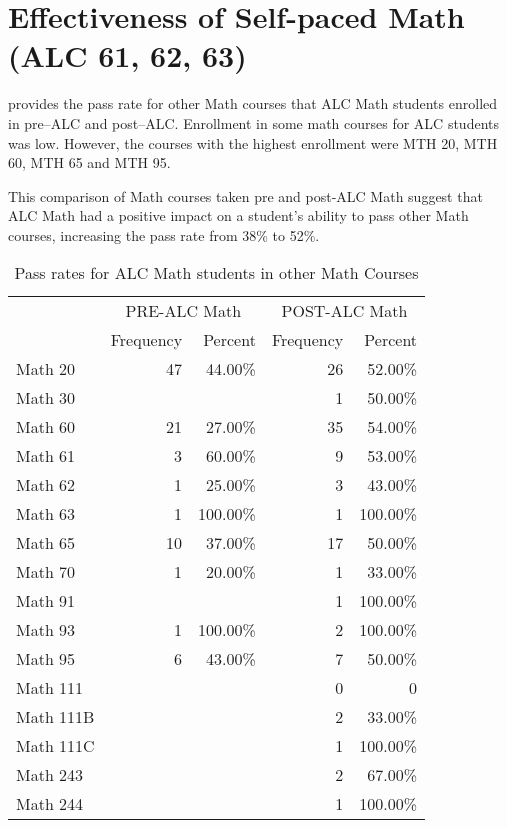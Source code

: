 \chapter{Effectiveness of Self-paced Math (ALC 61, 62, 63)}
\label{app:sec:effectivenessALC}

 provides the pass rate for other Math courses that ALC Math students 
enrolled in pre--ALC and post--ALC.  Enrollment in some math courses for 
ALC students was low.  However, the courses with the highest enrollment 
were MTH 20, MTH 60, MTH 65 and MTH 95.

This comparison of Math courses taken pre and post-ALC Math suggest 
that ALC Math had a positive impact on a student's ability to pass other 
Math courses, increasing the pass rate from 38\% to 52\%. 

\begin{table}[!htb]
	\centering
	\caption{Pass rates for ALC Math students in other Math Courses}
	\label{app:tab:effectivenessALC}
	\begin{tabular}{lrrrr}
		\toprule
		& \multicolumn{2}{c}{PRE-ALC Math}    & \multicolumn{2}{c}{POST-ALC Math}           \\ 
		          & Frequency & Percent  & Frequency & Percent  \\ 
		\midrule
		Math 20   & 47        & 44.00\%  & 26        & 52.00\%  \\ 
		Math 30   &           &          & 1         & 50.00\%  \\ 
		Math 60   & 21        & 27.00\%  & 35        & 54.00\%  \\ 
		Math 61   & 3         & 60.00\%  & 9         & 53.00\%  \\ 
		Math 62   & 1         & 25.00\%  & 3         & 43.00\%  \\ 
		Math 63   & 1         & 100.00\% & 1         & 100.00\% \\ 
		Math 65   & 10        & 37.00\%  & 17        & 50.00\%  \\ 
		Math 70   & 1         & 20.00\%  & 1         & 33.00\%  \\ 
		Math 91   &           &          & 1         & 100.00\% \\ 
		Math 93   & 1         & 100.00\% & 2         & 100.00\% \\ 
		Math 95   & 6         & 43.00\%  & 7         & 50.00\%  \\ 
		Math 111  &           &          & 0         & 0        \\ 
		Math 111B &           &          & 2         & 33.00\%  \\ 
		Math 111C &           &          & 1         & 100.00\% \\ 
		Math 243  &           &          & 2         & 67.00\%  \\ 
		Math 244  &           &          & 1         & 100.00\% \\ 
		\bottomrule
	\end{tabular}
\end{table}
